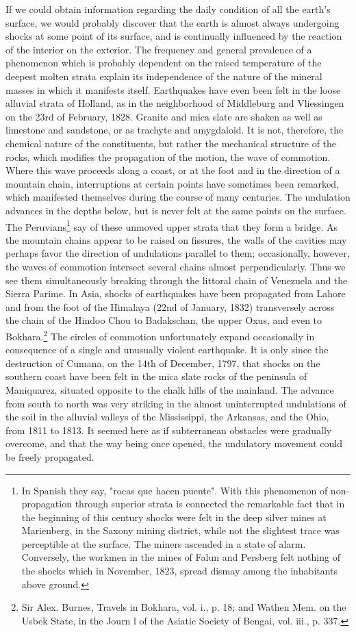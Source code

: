 If we could obtain information regarding the daily condition of all the earth's surface, we would probably discover that the earth is almost always undergoing shocks at some point of its surface, and is continually influenced by the reaction of the interior on the exterior. The frequency and general prevalence of a phenomenon which is probably dependent on the raised temperature of the deepest molten strata explain its independence of the nature of the mineral masses in which it manifests itself. Earthquakes have even been felt in the loose alluvial strata of Holland, as in the neighborhood of Middleburg and Vliessingen on the 23rd of February, 1828. Granite and mica slate are shaken as well as limestone and sandstone, or as trachyte and amygdaloid. It is not, therefore, the chemical nature of the constituents, but rather the mechanical structure of the rocks, which modifies the propagation of the motion, the wave of commotion. Where this wave proceeds along a coast, or at the foot and in the direction of a mountain chain, interruptions at certain points have sometimes been remarked, which manifested themselves during the course of many centuries. The undulation advances in the depths below, but is never felt at the same points on the surface. The Peruvians\footnote{In Spanish they say, "rocas que hacen puente". With this phenomenon of non-propagation through superior strata is connected the remarkable fact that in the beginning of this century shocks were felt in the deep silver mines at Marienberg, in the Saxony mining district, while not the slightest trace was perceptible at the surface. The miners ascended in a state of alarm. Conversely, the workmen in the mines of Falun and Persberg felt nothing of the shocks which in November, 1823, spread dismay among the inhabitants above ground.} say of these unmoved upper strata that they form a bridge. As the mountain chains appear to be raised on fissures, the walls of the cavities may perhaps favor the direction of undulations parallel to them; occasionally, however, the waves of commotion intersect several chains almost perpendicularly. Thus we see them simultaneously breaking through the littoral chain of Venezuela and the Sierra Parime. In Asia, shocks of earthquakes have been propagated from Lahore and from the foot of the Himalaya (22nd of January, 1832) transversely across the chain of the Hindoo Chou to Badakschan, the upper Oxus, and even to Bokhara.\footnote{Sir Alex. Burnes, Travels in Bokhara, vol. i., p. 18; and Wathen Mem. on the Usbek State, in the Journ l of the Asiatic Society of Bengai, vol. iii., p. 337.} The circles of commotion unfortunately expand occasionally in consequence of a single and unusually violent earthquake. It is only since the destruction of Cumana, on the 14th of December, 1797, that shocks on the southern coast have been felt in the mica slate rocks of the peninsula of Maniquarez, situated opposite to the chalk hills of the mainland. The advance from south to north was very striking in the almost uninterrupted undulations of the soil in the alluvial valleys of the Mississippi, the Arkansas, and the Ohio, from 1811 to 1813. It seemed here as if subterranean obstacles were gradually overcome, and that the way being once opened, the undulatory movement could be freely propagated.


